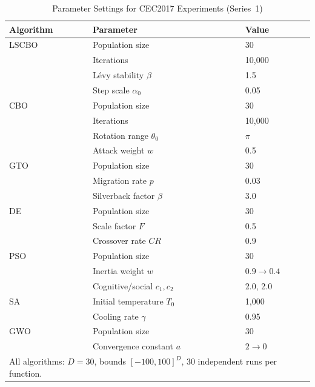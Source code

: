 \documentclass[pdflatex,onecolumn,sn-mathphys-num]{sn-jnl}
\begin{document}
\begin{table}[ht]
\centering
\caption{Parameter Settings for CEC2017 Experiments (Series~1)}\label{tab:param_cec}
\begin{tabular}{l l l}
\toprule
\textbf{Algorithm} & \textbf{Parameter} & \textbf{Value} \\
\midrule
LSCBO & Population size & 30 \\
       & Iterations & 10,000 \\
       & L\'{e}vy stability $\beta$ & 1.5 \\
       & Step scale $\alpha_0$ & 0.05 \\
\midrule
CBO & Population size & 30 \\
    & Iterations & 10,000 \\
    & Rotation range $\theta_0$ & $\pi$ \\
    & Attack weight $w$ & 0.5 \\
\midrule
GTO & Population size & 30 \\
    & Migration rate $p$ & 0.03 \\
    & Silverback factor $\beta$ & 3.0 \\
\midrule
DE & Population size & 30 \\
    & Scale factor $F$ & 0.5 \\
    & Crossover rate $CR$ & 0.9 \\
\midrule
PSO & Population size & 30 \\
    & Inertia weight $w$ & $0.9 \rightarrow 0.4$ \\
    & Cognitive/social $c_1, c_2$ & 2.0, 2.0 \\
\midrule
SA & Initial temperature $T_0$ & 1,000 \\
    & Cooling rate $\gamma$ & 0.95 \\
\midrule
GWO & Population size & 30 \\
    & Convergence constant $a$ & $2 \rightarrow 0$ \\
\midrule
\multicolumn{3}{l}{\footnotesize{All algorithms: $D=30$, bounds $[-100,100]^D$, 30 independent runs per function.}} \\
\bottomrule
\end{tabular}
\end{table}
\end{document}
